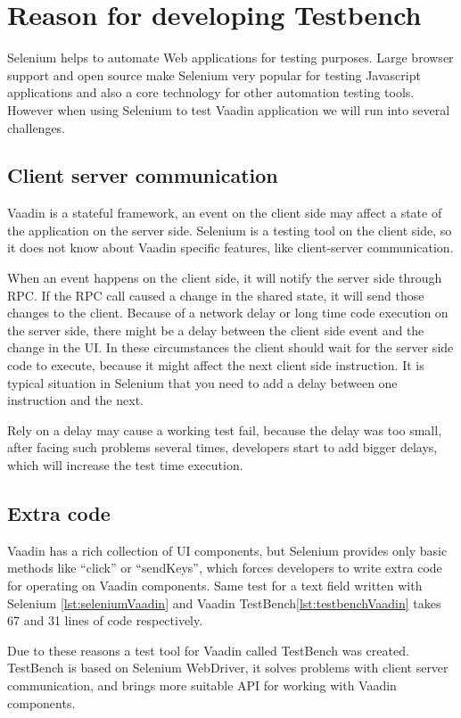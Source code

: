 \chapter{Reason for developing Testbench}
\label{ch:reasontestbenchdevelopment}
Selenium helps to automate Web applications for testing purposes. Large browser
support and open source make Selenium very popular for testing Javascript applications
and also a core technology for other automation testing tools. However when
using Selenium to test Vaadin application we will run into several challenges.

\section{Client server communication}
Vaadin is a stateful framework, an event on the client side may affect a state
of the application on the server side. Selenium is a testing tool on the client side, 
so it does not know about Vaadin specific features, like client-server communication. 

When an event happens on the client side, it will notify the server side through RPC.
If the RPC call caused a change in the shared state, it will send those changes to the client.
Because of a network delay or long time code execution on the server side, 
there might be a delay between the client side event and the change in the UI.
In these circumstances the client should wait for the server side code to execute,
because it might affect the next client side instruction.  
It is typical situation in Selenium that you need to add a delay between one instruction and the next.

Rely on a delay may cause a working test fail, because the delay was too small,
after facing such problems several times, developers start to add bigger delays,
which will increase the test time execution. 

\section{Extra code}
 Vaadin has a rich collection of UI components, but Selenium provides only
 basic methods like ``click'' or ``sendKeys'', which forces developers to write
 extra code for operating on Vaadin components. Same test for a text field
 written with Selenium \ref{lst:seleniumVaadin} and Vaadin
 TestBench\ref{lst:testbenchVaadin} takes 67 and 31 lines of code respectively.
   
 Due to these reasons a test tool for Vaadin called TestBench was created.
 TestBench is based on Selenium WebDriver, it solves  problems with client server communication,
 and brings more suitable API for working with Vaadin components.
